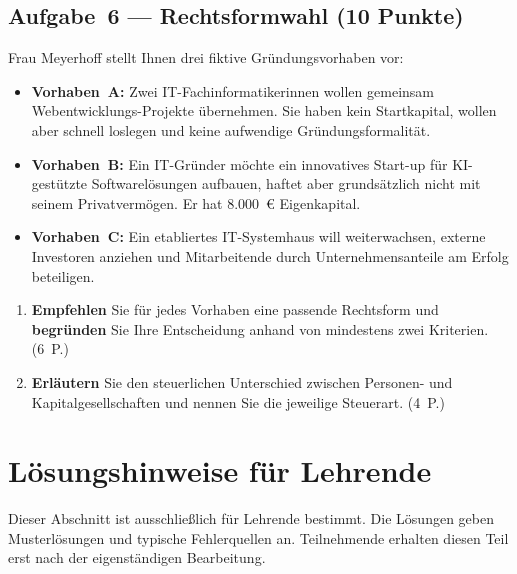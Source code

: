 \documentclass[11pt, a4paper]{article}
\begin{document}
\subsection*{Aufgabe~6 --- Rechtsformwahl (10 Punkte)}

Frau Meyerhoff stellt Ihnen drei fiktive Gründungsvorhaben vor:

\begin{itemize}
  \item \textbf{Vorhaben~A:} Zwei IT-Fachinformatikerinnen wollen gemeinsam Webentwicklungs-Projekte
  übernehmen. Sie haben kein Startkapital, wollen aber schnell loslegen und keine aufwendige
  Gründungsformalität.
  \item \textbf{Vorhaben~B:} Ein IT-Gründer möchte ein innovatives Start-up für KI-gestützte
  Softwarelösungen aufbauen, haftet aber grundsätzlich nicht mit seinem Privatvermögen. Er hat
  8.000~€ Eigenkapital.
  \item \textbf{Vorhaben~C:} Ein etabliertes IT-Systemhaus will weiterwachsen, externe Investoren
  anziehen und Mitarbeitende durch Unternehmensanteile am Erfolg beteiligen.
\end{itemize}

\begin{enumerate}[label=(\alph*)]
  \item \textbf{Empfehlen} Sie für jedes Vorhaben eine passende Rechtsform und \textbf{begründen}
  Sie Ihre Entscheidung anhand von mindestens zwei Kriterien. \hfill (6~P.)

  \vspace{7cm}

  \item \textbf{Erläutern} Sie den steuerlichen Unterschied zwischen Personen- und Kapitalgesellschaften
  und nennen Sie die jeweilige Steuerart. \hfill (4~P.)

  \vspace{4.5cm}
\end{enumerate}

\newpage
\section*{Lösungshinweise für Lehrende}
\label{loesungen}

\begin{merksatz}[title={\bfseries Hinweis zur Nutzung}]
Dieser Abschnitt ist ausschließlich für Lehrende bestimmt. Die Lösungen geben
Musterlösungen und typische Fehlerquellen an. Teilnehmende erhalten diesen Teil
erst nach der eigenständigen Bearbeitung.
\end{merksatz}
\end{document}
